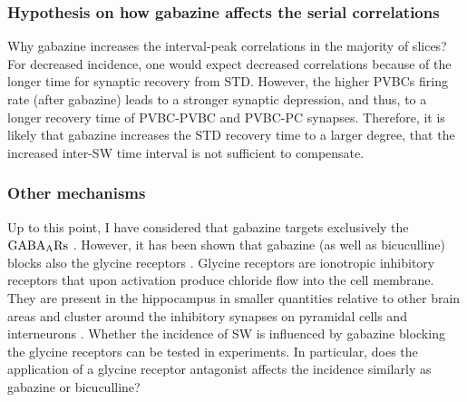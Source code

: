     \subsubsection{Hypothesis on how gabazine affects the serial correlations} 
      Why gabazine increases the interval-peak correlations in the majority of
      slices? For decreased incidence, one would expect decreased correlations
      because of the longer time for synaptic recovery from STD.  However, the
      higher PVBCs firing rate (after gabazine) leads to a stronger synaptic
      depression, and thus, to a longer recovery time of PVBC-PVBC and PVBC-PC
      synapses. Therefore, it is likely that gabazine increases the STD
      recovery time to a larger degree, that the increased inter-SW time
      interval is not sufficient to compensate.
      

    \subsubsection{Other mechanisms} 
      Up to this point, I have considered that gabazine targets exclusively the
      $\rm GABA_ARs$ . However, it has been shown that gabazine (as well as
      bicuculline) blocks also the glycine receptors \citep{Wang2005, Li2007}.
      Glycine receptors are ionotropic inhibitory receptors that upon
      activation produce chloride flow into the cell membrane. They are present
      in the hippocampus in smaller quantities relative to other brain areas
      \citep{denPol1988} and cluster around the inhibitory synapses on
      pyramidal cells and interneurons \citep{Levi2004}. Whether the incidence
      of SW is influenced by gabazine blocking the glycine receptors can be
      tested in experiments. In particular, does the application of a glycine
      receptor antagonist affects the incidence similarly as gabazine or
      bicuculline?

